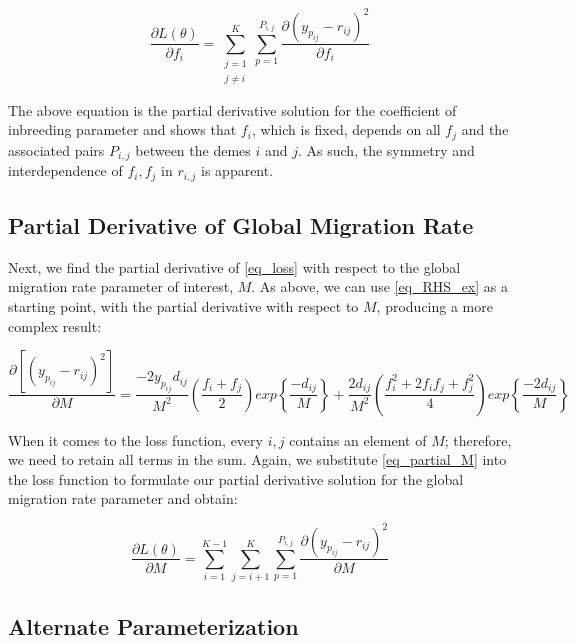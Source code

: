 \documentclass[a4paper, 12pt]{article}
\begin{document}
\begin{equation}
    \label{eq_loss_f}
    \frac{\partial L(\theta)}{\partial f_i} =  \sum_{\substack{j=1 \\ j\neq i}}^K \sum_{p=1}^{P_{i,j}} \frac{\partial (y_{p_{ij}} - r_{ij})^2}{\partial f_i}
\end{equation}

The above equation is the partial derivative solution for the coefficient of inbreeding parameter and shows that $f_i$, which is fixed, depends on all $f_j$ and the associated pairs $P_{i,j}$ between the demes $i$ and $j$. As such, the symmetry and interdependence of ${f_i, f_j}$ in $r_{i,j}$ is apparent.



\subsection{Partial Derivative of Global Migration Rate}
Next, we find the partial derivative of \eqref{eq_loss} with respect to the global migration rate parameter of interest, $M$. As above, we can use \eqref{eq_RHS_ex} as a starting point, with the partial derivative with respect to $M$, producing a more complex result:


\small
\begin{equation}
    \label{eq_partial_M}
    \frac{\partial [(y_{p_{ij}} - r_{ij})^2]}{\partial M} = \frac{-2y_{p_{ij}}d_{ij}}{M^2} \left(\frac{f_i + f_j}{2}\right) exp\left\{ \frac{-d_{ij}}{M} \right\} +
    \frac{2d_{ij}}{M^2}\left(\frac{f_i^2 + 2f_if_j + f_j^2}{4}\right) exp\left\{ \frac{-2d_{ij}}{M}  \right\}
\end{equation}
\normalsize


\noindent When it comes to the loss function, every $i,j$ contains an element of $M$; therefore, we need to retain all terms in the sum. Again, we substitute \eqref{eq_partial_M} into the loss function to formulate our partial derivative solution for the global migration rate parameter and obtain:

\begin{equation}
    \label{eq_loss_M}
    \frac{\partial L(\theta)}{\partial M} =  \sum_{i=1}^{K-1} \sum_{j=i+1}^K \sum_{p=1}^{P_{i,j}} \frac{\partial (y_{p_{ij}} - r_{ij})^2}{\partial M}
\end{equation}


\subsection{Alternate Parameterization}
\end{document}
